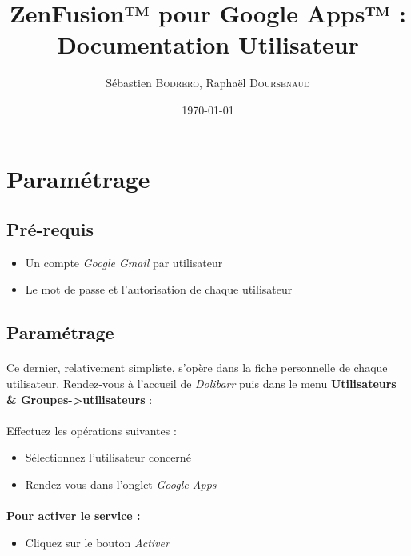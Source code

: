 \documentclass[12pt,a4paper,titlepage]{article}
\author{Sébastien \textsc{Bodrero}, Raphaël \textsc{Doursenaud}}
\title{ZenFusion™ pour Google Apps™ : Documentation Utilisateur}
\date{\today}
\begin{document}
	
	\maketitle	

\section{Paramétrage}
		\subsection{Pré-requis}
			\begin{itemize}
			\item Un compte \emph{Google Gmail} par utilisateur
			\item Le mot de passe et l'autorisation de chaque utilisateur
			\end{itemize}
		
		\subsection{Paramétrage}
		
			\paragraph{}Ce dernier, relativement simpliste, s'opère dans la fiche personnelle de chaque utilisateur.
			Rendez-vous à l'accueil de \emph{Dolibarr} puis dans le menu \textbf{Utilisateurs \& Groupes->utilisateurs} : 
			
			\paragraph{}
			Effectuez les opérations suivantes :
			
			\begin{itemize}
			\item Sélectionnez l'utilisateur concerné
			\item Rendez-vous dans l'onglet \emph{Google Apps}
			
			\end{itemize}
			
			\paragraph{}
			\textbf{Pour activer le service :}
			
			\begin{itemize}
			\item Cliquez sur le bouton \emph{Activer}
			\end{itemize}
			
\end{document}
